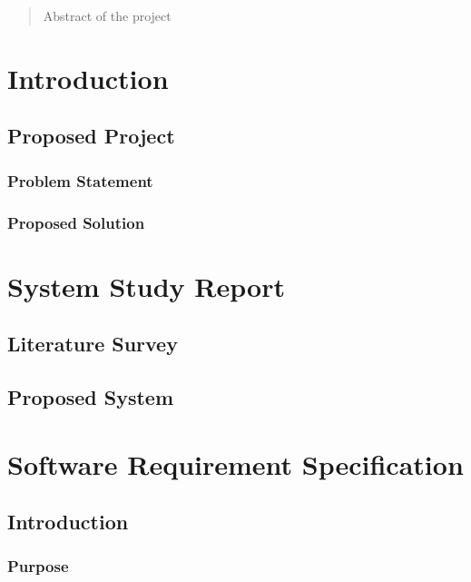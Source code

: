 \documentclass[11pt]{report}
\begin{document}
\begin{abstract}

Abstract of the project 
\end{abstract}

\tableofcontents

\cleardoublepage

\listoffigures

\cleardoublepage

\listoftables
 
\newpage

\chapter{Introduction}

\section{Proposed Project}

\subsection{Problem Statement}
\subsection{Proposed Solution}

\chapter{System Study Report}
\section{Literature Survey}
\section{Proposed System}

\chapter{Software Requirement Specification}
\section{Introduction}
 \subsection{Purpose}    
\end{document}
